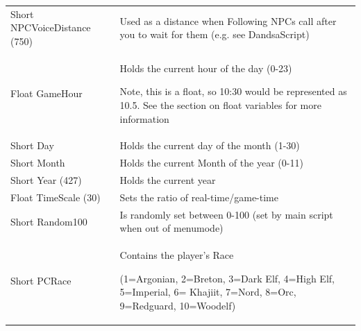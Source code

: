 \documentclass[
]{article}
\begin{document}
\begin{longtable}[]{@{}
  >{\raggedright\arraybackslash}p{}
  >{\raggedright\arraybackslash}p{}@{}}
\toprule
\endhead
Short NPCVoiceDistance (750) & Used as a distance when Following NPCs
call after you to wait for them (e.g. see DandsaScript) \\
Float GameHour & Holds the current hour of the day (0-23)

Note, this is a float, so 10:30 would be represented as 10.5. See the
section on float variables for more information \\
Short Day & Holds the current day of the month (1-30) \\
Short Month & Holds the current Month of the year (0-11) \\
Short Year (427) & Holds the current year \\
Float TimeScale (30) & Sets the ratio of real-time/game-time \\
Short Random100 & Is randomly set between 0-100 (set by main script when
out of menumode) \\
Short PCRace & Contains the player's Race

(1=Argonian, 2=Breton, 3=Dark Elf, 4=High Elf, 5=Imperial, 6= Khajiit,
7=Nord, 8=Orc, 9=Redguard, 10=Woodelf)


\end{longtable}
\end{document}

